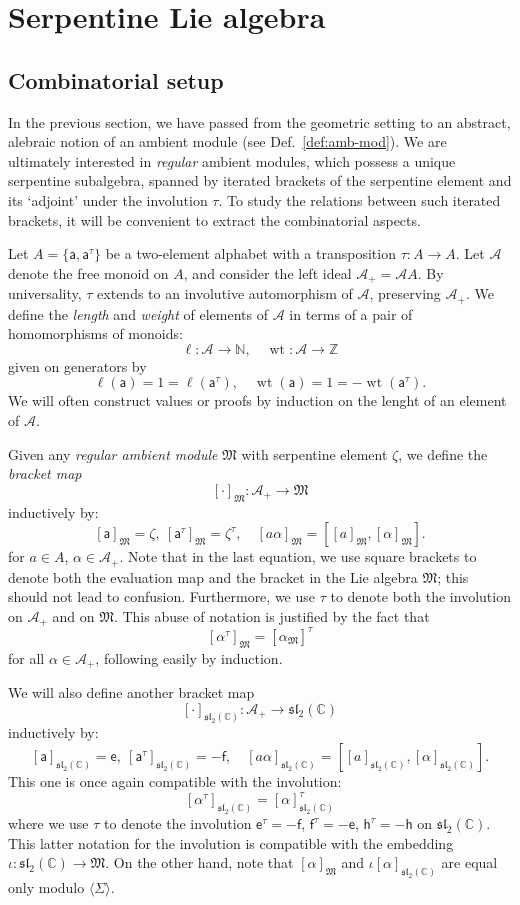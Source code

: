 \documentclass{article}
\def\fsl{\mathfrak{sl}}
\def\fM{\mathfrak{M}}
\def\sA{\mathcal{A}}
\def\ZZ{\mathbb{Z}}
\def\NN{\mathbb{N}}
\def\CC{\mathbb{C}}
\def\inv{\tau} %
\DeclareMathOperator{\wt}{\mathrm{wt}}
\def\a{\mathsf{a}}
\def\e{\mathsf{e}}
\def\h{\mathsf{h}}
\def\f{\mathsf{f}}
\theoremstyle{definition}
\begin{document}
\section{Serpentine Lie algebra}
\label{sec:algebra}
\subsection{Combinatorial setup}

In the previous section, we have
passed from the geometric setting
to an abstract, alebraic notion of an ambient module
(see Def.~\ref{def:amb-mod}). We are ultimately interested
in \emph{regular} ambient modules, which possess a unique
serpentine subalgebra, spanned by iterated brackets of
the serpentine element and its `adjoint' under the involution $\tau$.
To study the relations between such iterated brackets, it will be
convenient to extract the combinatorial aspects.

Let $A = \{\a,\a^\inv\}$ be a two-element
alphabet with a transposition $\inv:A \to A$.
Let $\sA$ denote the free monoid on $A$,
and consider the left ideal
$\sA_+ = \sA A$.
By universality, $\tau$ extends to an involutive
automorphism of $\sA$, preserving $\sA_+$. 
We define the \emph{length} and \emph{weight}
of elements of $\sA$ in terms of a pair of homomorphisms
of monoids:
$$
\ell : \sA \to \NN,\quad \wt : \sA \to \ZZ
$$
given on generators by
$$
\ell(\a) =1= \ell(\a^\tau),\quad 
\wt(\a) =1= -\wt(\a^\tau).
$$
We will often construct values or proofs by induction on the
lenght of an element of $\sA$.

Given any \emph{regular
ambient module} $\fM$ with serpentine element $\zeta$, we define the \emph{bracket map}
$$
[\cdot]_\fM : \sA_+ \to \fM
$$
inductively by:
$$ [\a]_\fM=\zeta,\ [\a^\inv]_\fM=\zeta^\inv,\quad
[a \alpha]_\fM = [ [a]_\fM, [\alpha]_\fM ].
$$
for $a \in A$, $\alpha\in\sA_+$.
Note that in the last equation,
we use square brackets to denote
both the evaluation map and the
bracket in the Lie algebra $\fM$;
this should not lead to confusion.
Furthermore, we use $\tau$ to denote
both the involution on $\sA_+$ and on $\fM$.
This abuse of notation is justified by the fact that 
$$
[\alpha^\tau]_\fM = [\alpha_\fM]^\tau
$$
for all $\alpha\in\sA_+$, following easily
by induction.

We will also define another bracket map
$$
[\cdot]_{\fsl_2(\CC)} : \sA_+ \to \fsl_2(\CC)
$$
inductively by:
$$ [\a]_{\fsl_2(\CC)}=\e,\ [\a^\inv]_{\fsl_2(\CC)}=-\f,\quad
[a \alpha]_{\fsl_2(\CC)} = [ [a]_{\fsl_2(\CC)}, [\alpha]_{\fsl_2(\CC)} ]. $$
This one is once again compatible with the involution:
$$ [\alpha^\tau]_{\fsl_2(\CC)} = [\alpha]_{\fsl_2(\CC)}^\tau $$
where
we use $\tau$ to denote the involution 
$\e^\tau=-\f$, $\f^\tau=-\e$, $\h^\tau=-\h$
on $\fsl_2(\CC)$. This latter notation for the involution is compatible
with the embedding $\iota:\fsl_2(\CC)\to\fM$.
On the other hand, note that
$[\alpha]_\fM$ and $\iota[\alpha]_{\fsl_2(\CC)}$
are equal only modulo $\langle\Sigma\rangle$.
\end{document}
